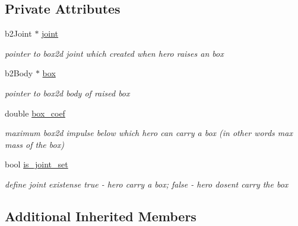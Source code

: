 \subsection*{Private Attributes}
\begin{DoxyCompactItemize}
\item 
\mbox{\label{class_strong_player_a4fc2a7b6a98d9f4d9bf7fc5d0d207ba8}} 
b2\+Joint $\ast$ \hyperlink{class_strong_player_a4fc2a7b6a98d9f4d9bf7fc5d0d207ba8}{joint}
\begin{DoxyCompactList}\small\item\em pointer to box2d joint which created when hero raises an box \end{DoxyCompactList}\item 
\mbox{\label{class_strong_player_a620cdfef8e86100906f5428830bc0508}} 
b2\+Body $\ast$ \hyperlink{class_strong_player_a620cdfef8e86100906f5428830bc0508}{box}
\begin{DoxyCompactList}\small\item\em pointer to box2d body of raised box \end{DoxyCompactList}\item 
\mbox{\label{class_strong_player_aa5869805ce789b52b40d6cc47ce23b93}} 
double \hyperlink{class_strong_player_aa5869805ce789b52b40d6cc47ce23b93}{box\+\_\+coef}
\begin{DoxyCompactList}\small\item\em maximum box2d impulse below which hero can carry a box (in other words max mass of the box) \end{DoxyCompactList}\item 
\mbox{\label{class_strong_player_a2556cd73a7a49ffe0aa24f300a9faeef}} 
bool \hyperlink{class_strong_player_a2556cd73a7a49ffe0aa24f300a9faeef}{is\+\_\+joint\+\_\+set}
\begin{DoxyCompactList}\small\item\em define joint existense \textquotesingle{}true\textquotesingle{} -\/ hero carry a box; \textquotesingle{}false\textquotesingle{} -\/ hero dosen\textquotesingle{}t carry the box \end{DoxyCompactList}\end{DoxyCompactItemize}
\subsection*{Additional Inherited Members}



